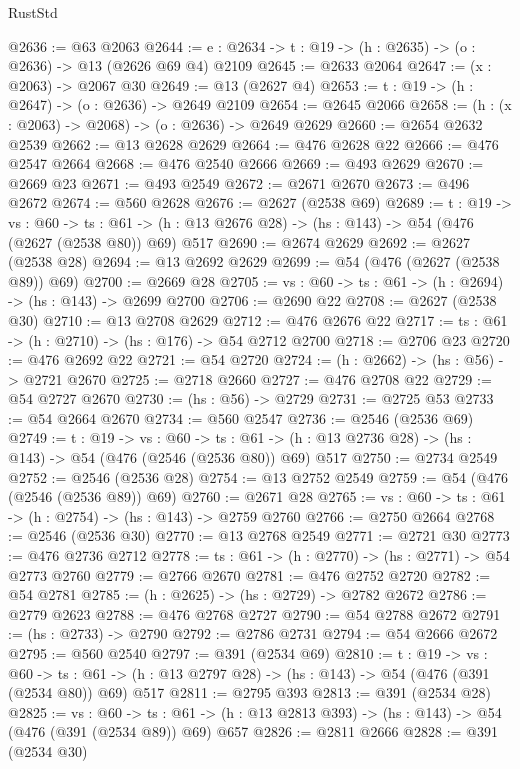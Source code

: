 \begin{lexlean}{RustStd}
\begin{coremodule}
@2636 := @63 @2063
@2644 := {e : @2634} -> {t : @19} -> (h : @2635) -> (o : @2636) -> @13 (@2626 @69 @4) @2109
@2645 := @2633 @2064
@2647 := (x : @2063) -> @2067 @30
@2649 := @13 (@2627 @4)
@2653 := {t : @19} -> (h : @2647) -> (o : @2636) -> @2649 @2109
@2654 := @2645 @2066
@2658 := (h : (x : @2063) -> @2068) -> (o : @2636) -> @2649 @2629
@2660 := @2654 @2632 @2539
@2662 := @13 @2628 @2629
@2664 := @476 @2628 @22
@2666 := @476 @2547 @2664
@2668 := @476 @2540 @2666
@2669 := @493 @2629
@2670 := @2669 @23
@2671 := @493 @2549
@2672 := @2671 @2670
@2673 := @496 @2672
@2674 := @560 @2628
@2676 := @2627 (@2538 @69)
@2689 := {t : @19} ->
  {vs : @60} ->
  {ts : @61} -> (h : @13 @2676 @28) -> (hs : @143) -> @54 (@476 (@2627 (@2538 @80)) @69) @517
@2690 := @2674 @2629
@2692 := @2627 (@2538 @28)
@2694 := @13 @2692 @2629
@2699 := @54 (@476 (@2627 (@2538 @89)) @69)
@2700 := @2669 @28
@2705 := {vs : @60} -> {ts : @61} -> (h : @2694) -> (hs : @143) -> @2699 @2700
@2706 := @2690 @22
@2708 := @2627 (@2538 @30)
@2710 := @13 @2708 @2629
@2712 := @476 @2676 @22
@2717 := {ts : @61} -> (h : @2710) -> (hs : @176) -> @54 @2712 @2700
@2718 := @2706 @23
@2720 := @476 @2692 @22
@2721 := @54 @2720
@2724 := (h : @2662) -> (hs : @56) -> @2721 @2670
@2725 := @2718 @2660
@2727 := @476 @2708 @22
@2729 := @54 @2727 @2670
@2730 := (hs : @56) -> @2729
@2731 := @2725 @53
@2733 := @54 @2664 @2670
@2734 := @560 @2547
@2736 := @2546 (@2536 @69)
@2749 := {t : @19} ->
  {vs : @60} ->
  {ts : @61} -> (h : @13 @2736 @28) -> (hs : @143) -> @54 (@476 (@2546 (@2536 @80)) @69) @517
@2750 := @2734 @2549
@2752 := @2546 (@2536 @28)
@2754 := @13 @2752 @2549
@2759 := @54 (@476 (@2546 (@2536 @89)) @69)
@2760 := @2671 @28
@2765 := {vs : @60} -> {ts : @61} -> (h : @2754) -> (hs : @143) -> @2759 @2760
@2766 := @2750 @2664
@2768 := @2546 (@2536 @30)
@2770 := @13 @2768 @2549
@2771 := @2721 @30
@2773 := @476 @2736 @2712
@2778 := {ts : @61} -> (h : @2770) -> (hs : @2771) -> @54 @2773 @2760
@2779 := @2766 @2670
@2781 := @476 @2752 @2720
@2782 := @54 @2781
@2785 := (h : @2625) -> (hs : @2729) -> @2782 @2672
@2786 := @2779 @2623
@2788 := @476 @2768 @2727
@2790 := @54 @2788 @2672
@2791 := (hs : @2733) -> @2790
@2792 := @2786 @2731
@2794 := @54 @2666 @2672
@2795 := @560 @2540
@2797 := @391 (@2534 @69)
@2810 := {t : @19} ->
  {vs : @60} ->
  {ts : @61} -> (h : @13 @2797 @28) -> (hs : @143) -> @54 (@476 (@391 (@2534 @80)) @69) @517
@2811 := @2795 @393
@2813 := @391 (@2534 @28)
@2825 := {vs : @60} ->
  {ts : @61} -> (h : @13 @2813 @393) -> (hs : @143) -> @54 (@476 (@391 (@2534 @89)) @69) @657
@2826 := @2811 @2666
@2828 := @391 (@2534 @30)

\end{coremodule}
\end{lexlean}
